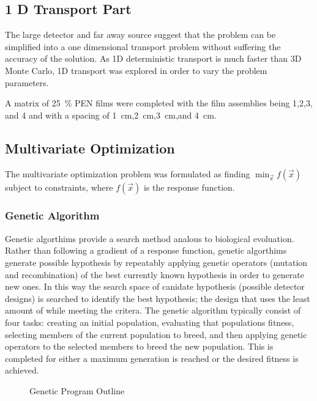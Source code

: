 \subsection{1 D Transport Part}
The large detector and far away source suggest that the problem can be simplified into a one dimensional transport problem without suffering the accuracy of the solution.
As 1D deterministic transport is much faster than 3D Monte Carlo, 1D transport was explored in order to vary the problem parameters.

A matrix of \SI{25}{\percent}  PEN films were completed with the film assemblies being 1,2,3, and 4 and with a spacing of \SI{1}{\centi\meter},\SI{2}{\centi\meter},\SI{3}{\centi\meter},and \SI{4}{\centi\meter}. 


\subsection{Multivariate Optimization}
\label{sec:MVOptimization}

The multivariate optimization problem was formulated as finding $\min_{\vec{x}} f (\vec{x})$ subject to constraints, where $f(\vec{x})$ is the response function.

\subsubsection{Genetic Algorithm}
\label{sec:GeneticAlgoMethods}
Genetic algorthims provide a search method analous to biological evoluation.
Rather than following a gradient of a response function, genetic algorthims generate possible hypothesis by repeatably applying genetic operators (mutation and recombination) of the best currently known hypothesis in order to generate new ones.
In this way the search space of canidate hypothesis (possible detector designs) is searched to identify the best hypothesis; the design that uses the least amount of  while meeting the critera.
The genetic algorithm typically consist of four tasks: creating an initial population, evaluating that populations fitness, selecting members of the current population to breed, and then applying genetic operators to the selected members to breed the new population. 
This is completed for either a maximum generation is reached or the desired fitness is achieved. 

\begin{figure}
\begin{algorithmic}
		\ENDFOR
		\ENDFOR
	\ENDWHILE
\end{algorithmic}
\caption{Genetic Program Outline}
\label{AlgoOutline}
\end{figure}

